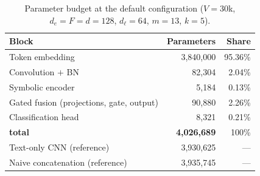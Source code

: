 \begin{table}[t]
\centering\small
\caption{Parameter budget at the default configuration ($V{=}30$k, $d_e{=}F{=}d{=}128$, $d_\ell{=}64$, $m{=}13$, $k{=}5$).}
\label{tab:params}
\begin{tabular}{lrr}
\toprule
Block & Parameters & Share \\
\midrule
Token embedding & 3{,}840{,}000 & 95.36\% \\
Convolution $+$ BN & 82{,}304 & 2.04\% \\
Symbolic encoder & 5{,}184 & 0.13\% \\
Gated fusion (projections, gate, output) & 90{,}880 & 2.26\% \\
Classification head & 8{,}321 & 0.21\% \\
\midrule
\textbf{\menet{} total} & \textbf{4{,}026{,}689} & 100\% \\
Text-only CNN (reference) & 3{,}930{,}625 & --- \\
Naive concatenation (reference) & 3{,}935{,}745 & --- \\
\bottomrule
\end{tabular}
\end{table}
